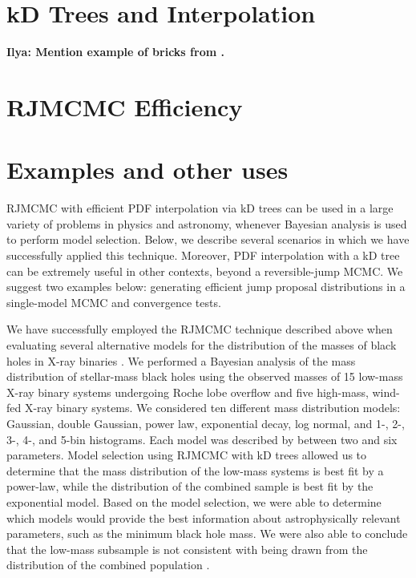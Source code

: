 \documentclass[prd,preprint]{revtex4}
\newcommand{\ilya}[1]{{\color{red} \bf Ilya: #1}}
\begin{document}
\section{kD Trees and Interpolation}

\ilya{Mention example of bricks from \cite{Littenberg2009}.}

\section{RJMCMC Efficiency}

\section{Examples and other uses} \label{sec:examples}

RJMCMC with efficient PDF interpolation via kD trees can be used in a large variety of problems in physics and astronomy, whenever Bayesian analysis is used to perform model selection.  Below, we describe several scenarios in which we have successfully applied this technique.  Moreover, PDF interpolation with a kD tree can be extremely useful in other contexts, beyond a reversible-jump MCMC.  We suggest two examples below: generating efficient jump proposal distributions in a single-model MCMC and convergence tests.


We have successfully employed the RJMCMC technique described above
when evaluating several alternative models for the distribution of the
masses of black holes in X-ray binaries \cite{Farr:2010}.  We
performed a Bayesian analysis of the mass distribution of stellar-mass
black holes using the observed masses of 15 low-mass X-ray binary
systems undergoing Roche lobe overflow and five high-mass, wind-fed
X-ray binary systems.  We considered ten different mass distribution
models: Gaussian, double Gaussian, power law, exponential decay, log
normal, and 1-, 2-, 3-, 4-, and 5-bin histograms.  Each model was
described by between two and six parameters.  Model selection using
RJMCMC with kD trees allowed us to determine that the mass
distribution of the low-mass systems is best fit by a power-law, while
the distribution of the combined sample is best fit by the exponential
model.  Based on the model selection, we were able to determine which
models would provide the best information about astrophysically
relevant parameters, such as the minimum black hole mass.  We were
also able to conclude that the low-mass subsample is not consistent
with being drawn from the distribution of the combined population
\cite{Farr:2010}.
\end{document}

